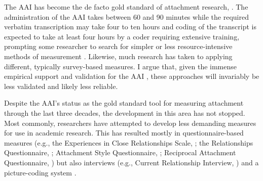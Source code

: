\documentclass[12pt]{report}
\begin{document}
The AAI has become the de facto gold standard of attachment research, \cite{AAITest, Talia2019, haltigan2014adult}.
The administration of the AAI takes between 60 and 90 minutes while the required verbatim transcription may take four to ten hours and coding of the transcript is expected to take at least four hours by a coder requiring extensive training, prompting some researcher to search for simpler or less resource-intensive methods of measurement \cite{Haas1994}.
Likewise, much research has taken to applying different, typically survey-based measures. I argue that, given the immense empirical support and validation for the AAI \cite{BakermansKranenburg1993, Ijzendoorn1995}, these approaches will invariably be less validated and likely less reliable.

Despite the AAI's status as the gold standard tool for measuring attachment through the last three decades, the development in this area has not stopped.
Most commonly, researchers have attempted to develop less demanding measures for use in academic research. This has resulted mostly in questionnaire-based measures (e.g., the Experiences in Close Relationships Scale, \cite{Brennan1998}; the Relationships Questionnaire, \cite{Bartholomew1991}; Attachment Style Questionnaire, \cite{Feeney1994ASQ}; Reciprocal Attachment Questionnaire, \cite{West1992}) but also interviews (e.g., Current Relationship Interview, \cite{Crowell1996}) and a picture-coding system \cite{George2012}.
\end{document}
